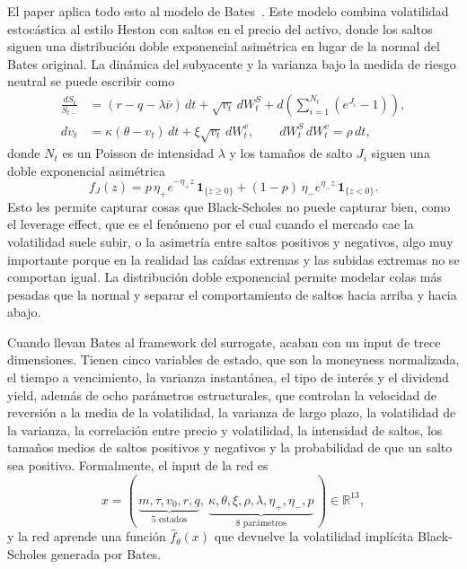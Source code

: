 \documentclass[11pt,a4paper]{article}
\begin{document}
El paper aplica todo esto al modelo de Bates~\cite{bates1996}. Este modelo combina volatilidad estocástica al estilo Heston con saltos en el precio del activo, donde los saltos siguen una distribución doble exponencial asimétrica en lugar de la normal del Bates original. La dinámica del subyacente y la varianza bajo la medida de riesgo neutral se puede escribir como
\begin{align}
\frac{dS_t}{S_{t-}} &= (r - q - \lambda \bar{\nu})\, dt + \sqrt{v_t}\, dW^S_t + d\!\left(\sum_{i=1}^{N_t}(e^{J_i} - 1)\right), \\
dv_t &= \kappa(\theta - v_t)\, dt + \xi \sqrt{v_t}\, dW^v_t, \qquad dW^S_t\, dW^v_t = \rho\, dt,
\end{align}
donde $N_t$ es un Poisson de intensidad $\lambda$ y los tamaños de salto $J_i$ siguen una doble exponencial asimétrica
\begin{equation}
f_J(z) = p\, \eta_+ e^{-\eta_+ z}\, \mathbf{1}_{\{z\geq 0\}} + (1-p)\, \eta_- e^{\eta_- z}\, \mathbf{1}_{\{z<0\}}.
\end{equation}
Esto les permite capturar cosas que Black-Scholes no puede capturar bien, como el leverage effect, que es el fenómeno por el cual cuando el mercado cae la volatilidad suele subir, o la asimetría entre saltos positivos y negativos, algo muy importante porque en la realidad las caídas extremas y las subidas extremas no se comportan igual. La distribución doble exponencial permite modelar colas más pesadas que la normal y separar el comportamiento de saltos hacia arriba y hacia abajo.

Cuando llevan Bates al framework del surrogate, acaban con un input de trece dimensiones. Tienen cinco variables de estado, que son la moneyness normalizada, el tiempo a vencimiento, la varianza instantánea, el tipo de interés y el dividend yield, además de ocho parámetros estructurales, que controlan la velocidad de reversión a la media de la volatilidad, la varianza de largo plazo, la volatilidad de la varianza, la correlación entre precio y volatilidad, la intensidad de saltos, los tamaños medios de saltos positivos y negativos y la probabilidad de que un salto sea positivo. Formalmente, el input de la red es
\begin{equation}
x = (\,\underbrace{m, \tau, v_0, r, q}_{\text{5 estados}},\ \underbrace{\kappa, \theta, \xi, \rho, \lambda, \eta_+, \eta_-, p}_{\text{8 parámetros}}\,) \in \mathbb{R}^{13},
\end{equation}
y la red aprende una función $\hat{f}_\theta(x)$ que devuelve la volatilidad implícita Black-Scholes generada por Bates.
\end{document}
